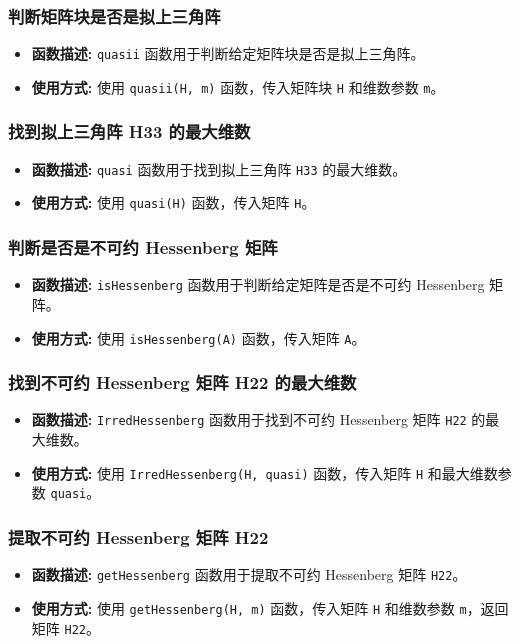 \documentclass{article}
\begin{document}
\subsubsection*{判断矩阵块是否是拟上三角阵}
\begin{itemize}
	\item \textbf{函数描述:} \texttt{quasii} 函数用于判断给定矩阵块是否是拟上三角阵。
	\item \textbf{使用方式:} 使用 \texttt{quasii(H, m)} 函数，传入矩阵块 \texttt{H} 和维数参数 \texttt{m}。
\end{itemize}

\subsubsection*{找到拟上三角阵 H33 的最大维数}
\begin{itemize}
	\item \textbf{函数描述:} \texttt{quasi} 函数用于找到拟上三角阵 \texttt{H33} 的最大维数。
	\item \textbf{使用方式:} 使用 \texttt{quasi(H)} 函数，传入矩阵 \texttt{H}。
\end{itemize}

\subsubsection*{判断是否是不可约 Hessenberg 矩阵}
\begin{itemize}
	\item \textbf{函数描述:} \texttt{isHessenberg} 函数用于判断给定矩阵是否是不可约 Hessenberg 矩阵。
	\item \textbf{使用方式:} 使用 \texttt{isHessenberg(A)} 函数，传入矩阵 \texttt{A}。
\end{itemize}

\subsubsection*{找到不可约 Hessenberg 矩阵 H22 的最大维数}
\begin{itemize}
	\item \textbf{函数描述:} \texttt{IrredHessenberg} 函数用于找到不可约 Hessenberg 矩阵 \texttt{H22} 的最大维数。
	\item \textbf{使用方式:} 使用 \texttt{IrredHessenberg(H, quasi)} 函数，传入矩阵 \texttt{H} 和最大维数参数 \texttt{quasi}。
\end{itemize}

\subsubsection*{提取不可约 Hessenberg 矩阵 H22}
\begin{itemize}
	\item \textbf{函数描述:} \texttt{getHessenberg} 函数用于提取不可约 Hessenberg 矩阵 \texttt{H22}。
	\item \textbf{使用方式:} 使用 \texttt{getHessenberg(H, m)} 函数，传入矩阵 \texttt{H} 和维数参数 \texttt{m}，返回矩阵 \texttt{H22}。
\end{itemize}
\end{document}
